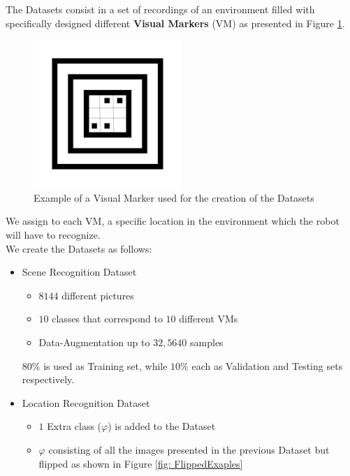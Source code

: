 \documentclass[a0, portrait]{IWIposter}
\begin{document}
\begin{multicols}{3}
The Datasets consist in a set of recordings of an environment filled with specifically designed different \textbf{Visual Markers} (VM) as presented in Figure \ref{fig:VisualMarker}. \\

\begin{figure}[H]
	\centering
	\includegraphics[width=0.5\textwidth]{VisualMarker.png}
	\caption{Example of a Visual Marker used for the creation of the Datasets}
	\label{fig:VisualMarker}
\end{figure}

We assign to each VM, a specific location in the environment which the robot will have to recognize. \\
We create the Datasets as follows:  

\begin{itemize}

\item Scene Recognition Dataset

	\begin{itemize}
	\item $8144$ different pictures
	\item $10$ classes that correspond to $10$ different VMs
	\item Data-Augmentation up to $32,5640$ samples
	\end{itemize}

$80\%$ is used as Training set, while $10\%$ each as Validation and Testing sets respectively.

\item Location Recognition Dataset

	\begin{itemize}
	\item $1$ Extra class ($\varphi$) is added to the Dataset
	\item $\varphi$ consisting of all the images presented in the previous Dataset but flipped as shown in Figure \ref{fig: FlippedExaples}
	\end{itemize}


\end{itemize}
\end{multicols}
\end{document}
